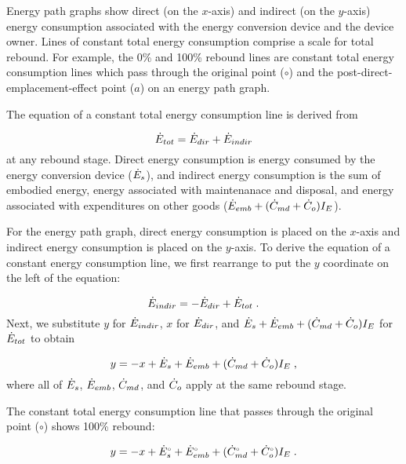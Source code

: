Energy path graphs show direct (on the $x$-axis) and indirect (on the $y$-axis)
energy consumption associated with the energy conversion device 
and the device owner.
Lines of constant total energy consumption comprise a 
scale for total rebound.
For example, the 0\% and 100\% rebound lines are constant total energy consumption
lines which pass through the original point ($\circ$) and
the post-direct-emplacement-effect point ($a$) 
on an energy path graph.

The equation of a constant total energy consumption line is derived from 

\begin{equation}
  \dot{E}_{tot} = \dot{E}_{dir} + \dot{E}_{indir}
\end{equation}
%
at any rebound stage.
Direct energy consumption is energy consumed by the energy conversion device
($\dot{E}_s$), and 
indirect energy consumption is the sum of embodied energy, 
energy associated with maintenanace and disposal, and energy associated 
with expenditures on other goods
($\dot{E}_{emb} + (\dot{C}_{md} + \dot{C}_o) I_E$).

For the energy path graph, 
direct energy consumption is placed on the $x$-axis and 
indirect energy consumption is placed on the $y$-axis.
To derive the equation of a constant energy consumption line, 
we first rearrange to put the $y$ coordinate on the left of the equation:

\begin{equation}
  \dot{E}_{indir} = - \dot{E}_{dir} + \dot{E}_{tot} \; .
\end{equation}
%
Next, we substitute $y$ for $\dot{E}_{indir}$,
$x$ for $\dot{E}_{dir}$, and 
$\dot{E}_s + \dot{E}_{emb} + (\dot{C}_{md} + \dot{C}_o) I_E$ for $\dot{E}_{tot}$
to obtain

\begin{equation}
  y = -x + \dot{E}_s + \dot{E}_{emb} + (\dot{C}_{md} + \dot{C}_o) I_E \; ,
\end{equation}
%
where all of $\dot{E}_s$, $\dot{E}_{emb}$, $\dot{C}_{md}$, and $\dot{C}_o$
apply at the same rebound stage.

The constant total energy consumption line 
that passes through the original point ($\circ$)
shows 100\% rebound:

\begin{equation}
  y = -x + {}{\dot{E}}^{\scriptscriptstyle \circ}_s + {}{\dot{E}}^{\scriptscriptstyle \circ}_{emb} + ({}{\dot{C}}^{\scriptscriptstyle \circ}_{md} + {}{\dot{C}}^{\scriptscriptstyle \circ}_o) I_E \; .
\end{equation}

